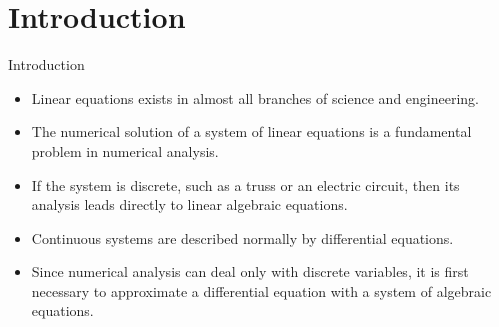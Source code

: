 \documentclass{beamer}
\begin{document}
\section[Introduction]{Introduction}
\begin{frame}{Introduction}
\begin{itemize}
  \item Linear equations exists in almost all branches of science and engineering.
  \item The numerical solution of a system of linear equations is a fundamental problem in numerical analysis.
  \item If the system is discrete, such as a truss or an electric circuit, then its analysis leads directly to linear algebraic equations.
  \item Continuous systems are described normally by differential equations.
  \item Since numerical analysis can deal only with discrete variables, it is first necessary to approximate a differential equation with a system of algebraic equations.
\end{itemize}
\end{frame}
\end{document}
